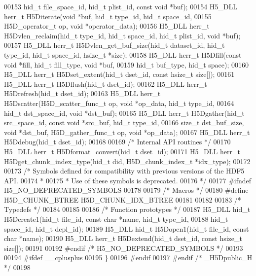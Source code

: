 \begin{DoxyCode}
00153              hid\_t file\_space\_id, hid\_t plist\_id, \textcolor{keyword}{const} \textcolor{keywordtype}{void} *buf);
00154 H5\_DLL herr\_t H5Diterate(\textcolor{keywordtype}{void} *buf, hid\_t type\_id, hid\_t space\_id,
00155             H5D\_operator\_t op, \textcolor{keywordtype}{void} *operator\_data);
00156 H5\_DLL herr\_t H5Dvlen\_reclaim(hid\_t type\_id, hid\_t space\_id, hid\_t plist\_id, \textcolor{keywordtype}{void} *buf);
00157 H5\_DLL herr\_t H5Dvlen\_get\_buf\_size(hid\_t dataset\_id, hid\_t type\_id, hid\_t space\_id, hsize\_t *size);
00158 H5\_DLL herr\_t H5Dfill(\textcolor{keyword}{const} \textcolor{keywordtype}{void} *fill, hid\_t fill\_type, \textcolor{keywordtype}{void} *buf,
00159         hid\_t buf\_type, hid\_t space);
00160 H5\_DLL herr\_t H5Dset\_extent(hid\_t dset\_id, \textcolor{keyword}{const} hsize\_t size[]);
00161 H5\_DLL herr\_t H5Dflush(hid\_t dset\_id);
00162 H5\_DLL herr\_t H5Drefresh(hid\_t dset\_id);
00163 H5\_DLL herr\_t H5Dscatter(H5D\_scatter\_func\_t op, \textcolor{keywordtype}{void} *op\_data, hid\_t type\_id,
00164     hid\_t dst\_space\_id, \textcolor{keywordtype}{void} *dst\_buf);
00165 H5\_DLL herr\_t H5Dgather(hid\_t src\_space\_id, \textcolor{keyword}{const} \textcolor{keywordtype}{void} *src\_buf, hid\_t type\_id,
00166     \textcolor{keywordtype}{size\_t} dst\_buf\_size, \textcolor{keywordtype}{void} *dst\_buf, H5D\_gather\_func\_t op, \textcolor{keywordtype}{void} *op\_data);
00167 H5\_DLL herr\_t H5Ddebug(hid\_t dset\_id);
00168 
00169 \textcolor{comment}{/* Internal API routines */}
00170 H5\_DLL herr\_t H5Dformat\_convert(hid\_t dset\_id);
00171 H5\_DLL herr\_t H5Dget\_chunk\_index\_type(hid\_t did, H5D\_chunk\_index\_t *idx\_type);
00172 
00173 \textcolor{comment}{/* Symbols defined for compatibility with previous versions of the HDF5 API.}
00174 \textcolor{comment}{ *}
00175 \textcolor{comment}{ * Use of these symbols is deprecated.}
00176 \textcolor{comment}{ */}
00177 \textcolor{preprocessor}{#ifndef H5\_NO\_DEPRECATED\_SYMBOLS}
00178 
00179 \textcolor{comment}{/* Macros */}
00180 \textcolor{preprocessor}{#define H5D\_CHUNK\_BTREE H5D\_CHUNK\_IDX\_BTREE}
00181 
00182 
00183 \textcolor{comment}{/* Typedefs */}
00184 
00185 
00186 \textcolor{comment}{/* Function prototypes */}
00187 H5\_DLL hid\_t H5Dcreate1(hid\_t file\_id, \textcolor{keyword}{const} \textcolor{keywordtype}{char} *name, hid\_t type\_id,
00188     hid\_t space\_id, hid\_t dcpl\_id);
00189 H5\_DLL hid\_t H5Dopen1(hid\_t file\_id, \textcolor{keyword}{const} \textcolor{keywordtype}{char} *name);
00190 H5\_DLL herr\_t H5Dextend(hid\_t dset\_id, \textcolor{keyword}{const} hsize\_t size[]);
00191 
00192 \textcolor{preprocessor}{#endif }\textcolor{comment}{/* H5\_NO\_DEPRECATED\_SYMBOLS */}\textcolor{preprocessor}{}
00193 
00194 \textcolor{preprocessor}{#ifdef \_\_cplusplus}
00195 \}
00196 \textcolor{preprocessor}{#endif}
00197 \textcolor{preprocessor}{#endif }\textcolor{comment}{/* \_H5Dpublic\_H */}\textcolor{preprocessor}{}
00198 
\end{DoxyCode}
